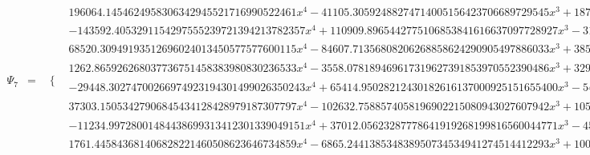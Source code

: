 \documentclass{article}
\begin{document}
\begin{landscape}
\begin{eqnarray*}
\begin{array}{cc}
\end{array}\\
\Psi_7 & = & \begin{array}{cc}
 \{ & 
\begin{array}{cc}
 196064.1454624958306342945521716990522461 x^4-41105.30592488274714005156423706689729545 x^3+1870.194068567404974065335824738946262358 x^2+11.97625587452118054138600635942436384494 x+0.1933128773378359832379203910216198576768 & x\geq 0\land x<\frac{1}{8} \\
 -143592.4053291154297555239721394213782357 x^4+110909.8965442775106853841616637097728927 x^3-31295.27542720718260769388891136983277724 x^2+3831.197817135743962209349759968341071813 x-172.9796511358074914569657762964530937578 & x\geq \frac{1}{8}\land x<\frac{1}{4} \\
 68520.30949193512696024013450577577600115 x^4-84607.71356808206268858624290905497886033 x^3+38555.64130055703604585570510385210522269 x^2-7691.753326994605151681253055574059114261 x+568.4732051474057179661693315044236901687 & x\geq \frac{1}{4}\land x<\frac{3}{8} \\
 1262.865926268037736751458383980830236533 x^4-3558.078189469617319627391853970552390486 x^3+3293.841540281167067692098015341887153843 x^2-1251.101430006927175008420408614016607367 x+167.8596883467644061156414201807944925404 & x\geq \frac{3}{8}\land x<\frac{1}{2} \\
 -29448.30274700266974923194301499026350243 x^4+65414.95028212430182616137000925151655400 x^3-54335.86945873215717759268414521776846478 x^2+20004.42255194631145392649105401463417238 x-2754.655069746344522380251416460682252051 & x\geq \frac{1}{2}\land x<\frac{5}{8} \\
 37303.15053427906845434128428979187307797 x^4-102632.7588574058196902215080943027607942 x^3+105702.5519314582537064745215637533357796 x^2-48299.66113290653846357331059442288261996 x+8262.198164542638268987320391086123944927 & x\geq \frac{5}{8}\land x<\frac{3}{4} \\
 -11234.99728001484438699313412301339049151 x^4+37012.05623287778641919268199816560044771 x^3-45679.81845155733319202052704909788476321 x^2+25031.39341338423449428464761542247087198 x-5138.392439076136786458326540902504091357 & x\geq \frac{3}{4}\land x<\frac{7}{8} \\
 1761.445843681406828221460508623646734859 x^4-6865.244138534838950734534941274514412293 x^3+10015.87924064564965115128061606457253812 x^2-6481.809440412409762984798442800188778790 x+1569.728494620192234346592259386483918108 & x\geq \frac{7}{8}\land x<1 \\

\end{array}
\end{array}
\end{eqnarray*}
\end{landscape}
\end{document}
